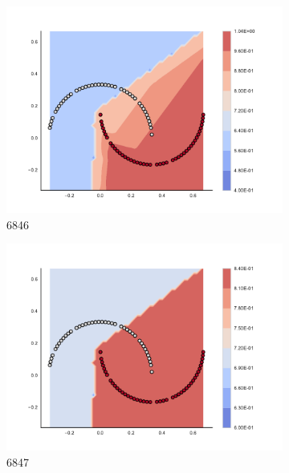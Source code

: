 \begin{figure}[h]
\begin{subfigure}[b]{0.09\textwidth}
    \includegraphics[clip, trim=2.35cm 1.75cm 4.5cm 0cm,width=\textwidth]{img/convergence/6846.pdf}
    \caption{6846}
    \label{fig:convergence_6846}
\end{subfigure}
%
\begin{subfigure}[b]{0.09\textwidth}
    \includegraphics[clip, trim=2.35cm 1.75cm 4.5cm 0cm,width=\textwidth]{img/convergence/6847.pdf}
    \caption{6847}
    \label{fig:convergence_6847}
\end{subfigure}
%
\begin{subfigure}[b]{0.09\textwidth}

\end{subfigure}
\end{figure}
